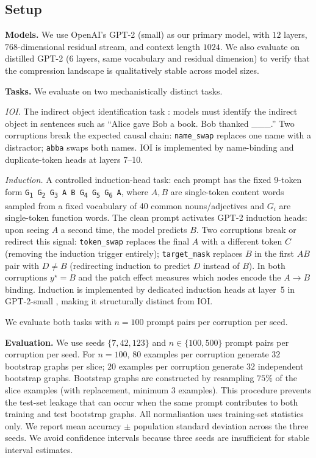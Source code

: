 \documentclass[11pt,a4paper]{article}
\begin{document}
\subsection{Setup}
\label{sec:setup}

\textbf{Models.} We use OpenAI's GPT-2 (small) \cite{radford2019language} as our primary model, with $12$ layers, $768$-dimensional residual stream, and context length $1024$. We also evaluate on distilled GPT-2 (6 layers, same vocabulary and residual dimension) to verify that the compression landscape is qualitatively stable across model sizes.

\textbf{Tasks.} We evaluate on two mechanistically distinct tasks.

\textit{IOI.} The indirect object identification task \cite{turpin2023algorithmic}: models must identify the indirect object in sentences such as ``Alice gave Bob a book. Bob thanked \_\_\_.'' Two corruptions break the expected causal chain: \texttt{name\_swap} replaces one name with a distractor; \texttt{abba} swaps both names. IOI is implemented by name-binding and duplicate-token heads at layers 7--10.

\textit{Induction.} A controlled induction-head task: each prompt has the fixed 9-token form \texttt{G\textsubscript{1} G\textsubscript{2} G\textsubscript{3} A B G\textsubscript{4} G\textsubscript{5} G\textsubscript{6} A}, where $A, B$ are single-token content words sampled from a fixed vocabulary of 40 common nouns/adjectives and $G_i$ are single-token function words. The clean prompt activates GPT-2 induction heads: upon seeing $A$ a second time, the model predicts $B$. Two corruptions break or redirect this signal: \texttt{token\_swap} replaces the final $A$ with a different token $C$ (removing the induction trigger entirely); \texttt{target\_mask} replaces $B$ in the first $AB$ pair with $D \neq B$ (redirecting induction to predict $D$ instead of $B$). In both corruptions $y^\star = B$ and the patch effect measures which nodes encode the $A \to B$ binding. Induction is implemented by dedicated induction heads at layer~5 in GPT-2-small \cite{olsson2022context}, making it structurally distinct from IOI.

We evaluate both tasks with $n = 100$ prompt pairs per corruption per seed.

\textbf{Evaluation.} We use seeds $\{7, 42, 123\}$ and $n \in \{100, 500\}$ prompt pairs per corruption per seed. For $n=100$, $80$ examples per corruption generate $32$ bootstrap graphs per slice; $20$ examples per corruption generate $32$ independent bootstrap graphs. Bootstrap graphs are constructed by resampling $75\%$ of the slice examples (with replacement, minimum $3$ examples). This procedure prevents the test-set leakage that can occur when the same prompt contributes to both training and test bootstrap graphs. All normalisation uses training-set statistics only. We report mean accuracy $\pm$ population standard deviation across the three seeds. We avoid confidence intervals because three seeds are insufficient for stable interval estimates.
\end{document}
